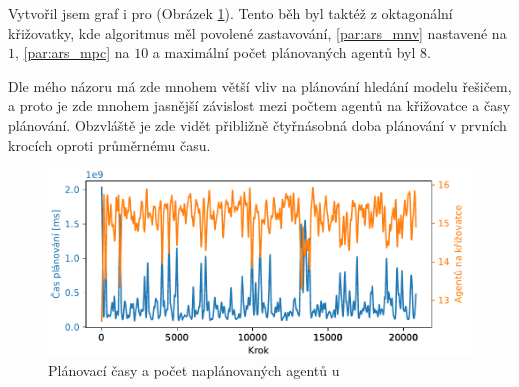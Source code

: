 Vytvořil jsem graf i pro  (Obrázek \ref{fig:cas_vs_agenti_satra}).
Tento běh byl taktéž z oktagonální křižovatky, kde algoritmus měl povolené zastavování,
\ref{par:ars_mnv} nastavené na $1$, \ref{par:ars_mpc} na $10$ a maximální počet plánovaných agentů byl $8$.

Dle mého názoru má zde mnohem větší vliv na plánování hledání modelu řešičem,
a proto je zde mnohem jasnější závislost mezi počtem agentů na křižovatce a časy plánování.
Obzvláště je zde vidět přibližně čtyřnásobná doba plánování v prvních krocích oproti průměrnému času.


\begin{figure}[h]
	\centering
	\includegraphics[width=140mm]{../img/CasVsAgentiSATRA}
	\caption{Plánovací časy a počet naplánovaných agentů u }
	\label{fig:cas_vs_agenti_satra}
\end{figure}

